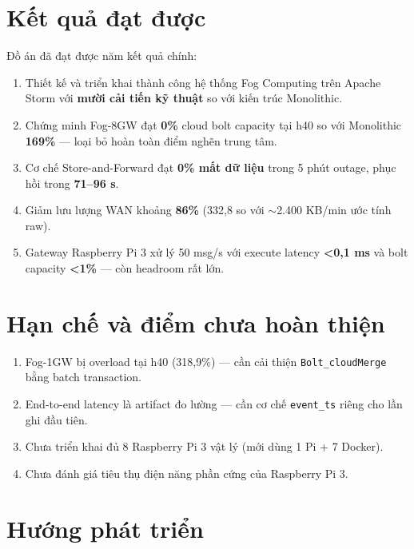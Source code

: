 \documentclass[13pt,a4paper]{report}
\newcommand{\code}[1]{\texttt{\small #1}}
\begin{document}
\section{Kết quả đạt được}

Đồ án đã đạt được năm kết quả chính:

\begin{enumerate}
  \item Thiết kế và triển khai thành công hệ thống Fog Computing trên Apache
        Storm với \textbf{mười cải tiến kỹ thuật} so với kiến trúc Monolithic.
  \item Chứng minh Fog-8GW đạt \textbf{0\%} cloud bolt capacity tại h40 so với
        Monolithic \textbf{169\%} --- loại bỏ hoàn toàn điểm nghẽn trung tâm.
  \item Cơ chế Store-and-Forward đạt \textbf{0\% mất dữ liệu} trong 5 phút outage,
        phục hồi trong \textbf{71--96 s}.
  \item Giảm lưu lượng WAN khoảng \textbf{86\%} (332,8 so với $\sim$2.400 KB/min
        ước tính raw).
  \item Gateway Raspberry Pi 3 xử lý 50 msg/s với execute latency \textbf{\textless 0,1 ms}
        và bolt capacity \textbf{\textless 1\%} --- còn headroom rất lớn.
\end{enumerate}

\section{Hạn chế và điểm chưa hoàn thiện}

\begin{enumerate}
  \item Fog-1GW bị overload tại h40 (318,9\%) --- cần cải thiện
        \code{Bolt\_cloudMerge} bằng batch transaction.
  \item End-to-end latency là artifact đo lường --- cần cơ chế \code{event\_ts}
        riêng cho lần ghi đầu tiên.
  \item Chưa triển khai đủ 8 Raspberry Pi 3 vật lý (mới dùng 1 Pi + 7 Docker).
  \item Chưa đánh giá tiêu thụ điện năng phần cứng của Raspberry Pi 3.
\end{enumerate}

\section{Hướng phát triển}
\end{document}
